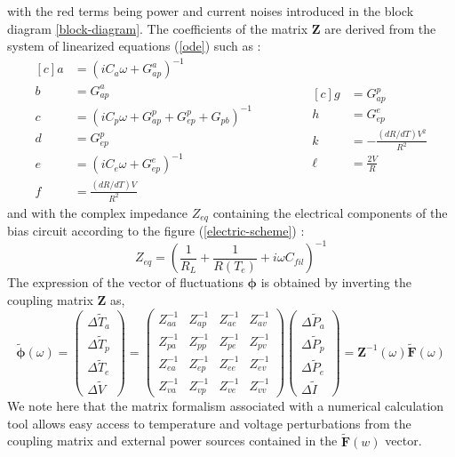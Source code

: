 with the red terms being power and current noises introduced in the block diagram \ref{block-diagram}. The coefficients of the matrix $\bm{Z}$ are derived from the system of linearized equations (\ref{ode}) such as :
\begin{equation}
\begin{aligned}[c]
a &=(i C_a \omega + G_{ap}^a)^{-1} \\
b &=G_{ap}^a \\
c &=(i C_p \omega + G_{ap}^p + G_{ep}^p + G_{pb})^{-1} \\
d &=G_{ep}^p \\
e &=(i C_e \omega + G_{ep}^e)^{-1}\\
f &=\frac{(dR/dT) V}{R^2} 
\end{aligned}
\qquad \qquad
\begin{aligned}[c]
g &=G_{ap}^p \\
h &=G_{ep}^e \\
k &=- \frac{(dR/dT) V^{2}}{R^{2}} \\
\ell &=\frac{2 V}{R}
\end{aligned}
\label{coef}
\end{equation}
and with the complex impedance $Z_{eq}$ containing the electrical components of the bias circuit according to the figure (\ref{electric-scheme}) :
\begin{equation}
Z_{eq} = \left(\frac{1}{R_L} + \frac{1}{R(T_e)} + i\omega C_{fil}\right)^{-1}
\end{equation}
The expression of the vector of fluctuations $\bm{\phi}$ is obtained by inverting the coupling matrix $\bm{Z}$ as, 
\begin{equation}
\bm{\tilde{\phi}} (\omega) =
\left( \begin{array}{c}
\Delta \tilde{T}_a\\
\Delta \tilde{T}_p\\
\Delta \tilde{T}_e\\
\Delta \tilde{V}
\end{array} \right)
=
\left( \begin{array}{cccc}
 Z_{aa}^{-1}&Z_{ap}^{-1}&Z_{ae}^{-1}&Z_{av}^{-1} \\
 Z_{pa}^{-1}&Z_{pp}^{-1}&Z_{pe}^{-1}&Z_{pv}^{-1}\\
 Z_{ea}^{-1}&Z_{ep}^{-1}&Z_{ee}^{-1}&Z_{ev}^{-1}\\
 Z_{va}^{-1}&Z_{vp}^{-1}&Z_{ve}^{-1}&Z_{vv}^{-1}
\end{array} \right)
\left( \begin{array}{c}
\Delta \tilde{P}_a\\
\Delta \tilde{P}_p\\
\Delta \tilde{P}_e\\
\Delta \tilde{I}
\end{array} \right)
= \bm{Z}^{-1}(\omega) \bm{\tilde{F}} (\omega)
\end{equation}
We note here that the matrix formalism associated with a numerical calculation tool allows easy access to temperature and voltage perturbations from the coupling matrix and external power sources contained in the $\bm{\tilde{F}}(w)$ vector.

